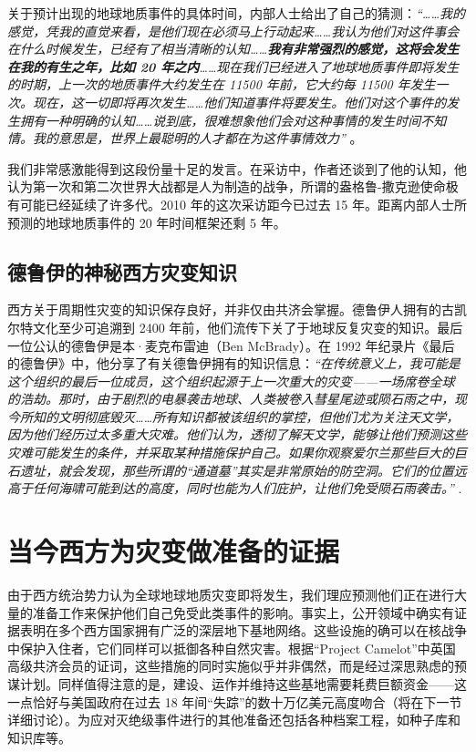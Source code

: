 \documentclass[10pt,twocolumn,letterpaper]{article}
\begin{document}
关于预计出现的地球地质事件的具体时间，内部人士给出了自己的猜测：\textit{“……我的感觉，凭我的直觉来看，是他们现在必须马上行动起来……我认为他们对这件事会在什么时候发生，已经有了相当清晰的认知……\textbf{我有非常强烈的感觉，这将会发生在我的有生之年，比如 20 年之内}……现在我们已经进入了地球地质事件即将发生的时期，上一次的地质事件大约发生在 11500 年前，它大约每 11500 年发生一次。现在，这一切即将再次发生……他们知道事件将要发生。他们对这个事件的发生拥有一种明确的认知……说到底，很难想象他们会对这种事情的发生时间不知情。我的意思是，世界上最聪明的人才都在为这件事情效力”} \cite{4}。

我们非常感激能得到这段份量十足的发言。在采访中，作者还谈到了他的认知，他认为第一次和第二次世界大战都是人为制造的战争，所谓的盎格鲁-撒克逊使命极有可能已经延续了许多代。2010 年的这次采访距今已过去 15 年。距离内部人士所预测的地球地质事件的 20 年时间框架还剩 5 年。

\subsection{德鲁伊的神秘西方灾变知识}

西方关于周期性灾变的知识保存良好，并非仅由共济会掌握。德鲁伊人拥有的古凯尔特文化至少可追溯到 2400 年前\cite{7}，他们流传下关了于地球反复灾变的知识。最后一位公认的德鲁伊是本·麦克布雷迪（Ben McBrady）。在 1992 年纪录片《最后的德鲁伊》中，他分享了有关德鲁伊拥有的知识信息：\textit{“在传统意义上，我可能是这个组织的最后一位成员，这个组织起源于上一次重大的灾变——一场席卷全球的浩劫。那时，由于剧烈的电暴袭击地球、人类被卷入彗星尾迹或陨石雨之中，现今所知的文明彻底毁灭……所有知识都被该组织的掌控，但他们尤为关注天文学，因为他们经历过太多重大灾难。他们认为，透彻了解天文学，能够让他们预测这些灾难可能发生的条件，并采取某种措施保护自己。如果你观察爱尔兰那些巨大的巨石遗址，就会发现，那些所谓的“通道墓”其实是非常原始的防空洞。它们的位置远高于任何海啸可能到达的高度，同时也能为人们庇护，让他们免受陨石雨袭击。”} \cite{8,9}.

\section{当今西方为灾变做准备的证据}

由于西方统治势力认为全球地球地质灾变即将发生，我们理应预测他们正在进行大量的准备工作来保护他们自己免受此类事件的影响。事实上，公开领域中确实有证据表明在多个西方国家拥有广泛的深层地下基地网络。这些设施的确可以在核战争中保护入住者，它们同样可以抵御各种自然灾害。根据“Project Camelot”中英国高级共济会员的证词\cite{4,6}，这些措施的同时实施似乎并非偶然，而是经过深思熟虑的预谋计划。同样值得注意的是，建设、运作并维持这些基地需要耗费巨额资金——这一点恰好与美国政府在过去 18 年间“失踪”的数十万亿美元高度吻合（将在下一节详细讨论）\cite{11,12,13}。为应对灭绝级事件进行的其他准备还包括各种档案工程，如种子库和知识库等。
\end{document}
